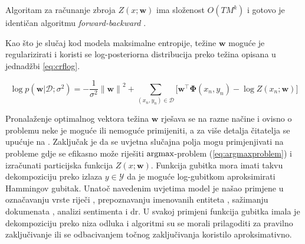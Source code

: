 Algoritam za računanje zbroja $Z(x; \mathbf{w})$ ima složenost $O(T M ^ k)$ i
gotovo je identičan algoritmu \textit{forward-backward}
\citep{baum1966statistical}.

Kao što je slučaj kod modela maksimalne entropije, težine $\mathbf{w}$ moguće je
regularizirati i koristi se log-posteriorna distribucija preko težina opisana u
jednadžbi \ref{eq:crflog}.

\begin{equation}\label{eq:crflog}
  \log p(\mathbf{w} | \mathcal{D}; \sigma^2) = -\frac{1}{\sigma^2} {\lVert\mathbf{w}\lVert}^2 + \sum_{(x_n, y_n) \in \mathcal{D}} \bigg[ \mathbf{w}^\top \mathbf{\Phi}(x_n, y_n) - \log Z(x_n; \mathbf{w}) \bigg]
\end{equation}

\noindent
Pronalaženje optimalnog vektora težina $\mathbf{w}$ rješava se na razne načine
\citep{lafferty2001conditional, sha2003shallow, sokolovska2010efficient} i
ovisno o problemu neke je moguće ili nemoguće primijeniti, a za više detalja
čitatelja se upućuje na \citep{wallach2004conditional, sutton2006introduction}.
Zaključak je da se uvjetna slučajna polja mogu primjenjivati na probleme gdje
se efikasno može riješiti $\operatorname*{argmax}$-problem (\ref{eq:argmaxproblem}) i
izračunati particijska funkcija $Z(x; \mathbf{w})$. Funkcija gubitka mora imati
takvu dekompoziciju preko izlaza $y \in \mathcal{Y}$ da je moguće log-gubitkom
aproksimirati Hammingov gubitak. Unatoč navedenim uvjetima model je našao
primjene u označavanju vrste riječi \citep{lafferty2001conditional},
prepoznavanju imenovanih entiteta \citep{mccallum2003early,
settles2004biomedical}, sažimanju dokumenata 
\citep{shen2007document}, analizi sentimenta \citep{mcdonald2007structured} i dr.
U svakoj primjeni funkcija gubitka imala je dekompoziciju preko niza odluka i
algoritmi su se morali prilagoditi za pravilno zaključivanje ili se odbacivanjem
točnog zaključivanja koristilo aproksimativno.
